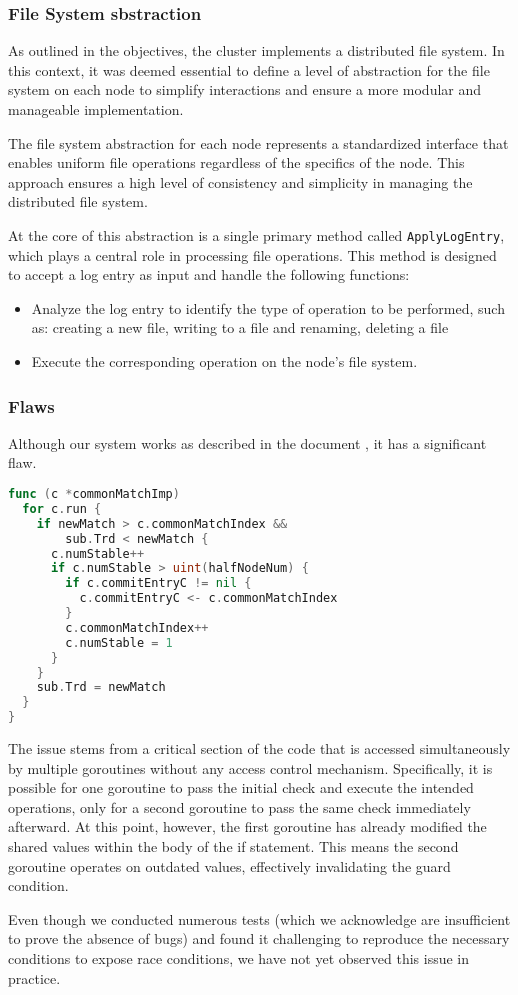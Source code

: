 \subsubsection{File System sbstraction}
As outlined in the objectives, the cluster implements a distributed file system.
In this context, it was deemed essential to define a level of abstraction for the 
file system on each node to simplify interactions and ensure a more modular and 
manageable implementation.

The file system abstraction for each node represents a standardized interface that 
enables uniform file operations regardless of the specifics of the node. This approach 
ensures a high level of consistency and simplicity in managing the distributed file system.

At the core of this abstraction is a single primary method called \texttt{ApplyLogEntry}, which 
plays a central role in processing file operations. This method is designed to accept 
a log entry as input and handle the following functions:
\begin{itemize}
  \item Analyze the log entry to identify the type of operation to be performed, such as: 
    creating a new file, writing to a file and renaming, deleting a file
  \item Execute the corresponding operation on the node's file system.
\end{itemize}


\subsubsection{Flaws}
Although our system works as described in the document \cite{1}, it has a significant flaw.
\begin{lstlisting}[language=Go]
func (c *commonMatchImp) 
  for c.run { 
    if newMatch > c.commonMatchIndex && 
        sub.Trd < newMatch { 
      c.numStable++ 
      if c.numStable > uint(halfNodeNum) {
        if c.commitEntryC != nil {
          c.commitEntryC <- c.commonMatchIndex
        } 
        c.commonMatchIndex++
        c.numStable = 1
      } 
    } 
    sub.Trd = newMatch
  } 
}
\end{lstlisting}
The issue stems from a critical section of the code that is accessed simultaneously
by multiple goroutines without any access control mechanism. Specifically, it is 
possible for one goroutine to pass the initial check and execute the intended operations, 
only for a second goroutine to pass the same check immediately afterward. At this point, 
however, the first goroutine has already modified the shared values within the body 
of the if statement. This means the second goroutine operates on outdated values, 
effectively invalidating the guard condition.

Even though we conducted numerous tests (which we acknowledge are insufficient to 
prove the absence of bugs) and found it challenging to reproduce the necessary 
conditions to expose race conditions, we have not yet observed this issue in practice.
